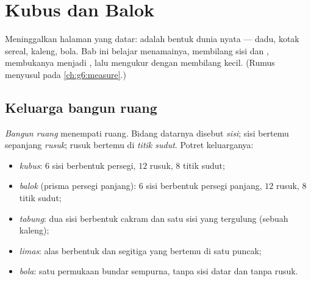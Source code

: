\chapter{Kubus dan Balok}\label{ch:g5:solids}

Meninggalkan halaman yang datar:  adalah bentuk dunia
nyata --- dadu, kotak sereal, kaleng, bola. Bab ini belajar
menamainya, membilang sisi dan , membukanya menjadi
, lalu mengukur  dengan membilang  kecil.
(Rumus  menyusul pada \cref{ch:g6:measure}.)

\section{Keluarga bangun ruang}

\begin{definition}\label{def:g5:solids:def}
\emph{Bangun ruang} menempati ruang. Bidang
datarnya disebut \emph{sisi}; sisi bertemu sepanjang
\emph{rusuk}; rusuk bertemu di \emph{titik
sudut}. Potret keluarganya:
\begin{itemize}
  \item \emph{kubus}: $6$ sisi berbentuk persegi, $12$
        rusuk, $8$ titik sudut;
  \item \emph{balok} (prisma persegi panjang): $6$ sisi
        berbentuk persegi panjang, $12$ rusuk, $8$ titik sudut;
  \item \emph{tabung}: dua sisi berbentuk cakram dan satu sisi
        yang tergulung (sebuah kaleng);
  \item \emph{limas}: alas berbentuk  dan segitiga yang
        bertemu di satu puncak;
  \item \emph{bola}: satu permukaan bundar sempurna, tanpa sisi
        datar dan tanpa rusuk.
\end{itemize}
\end{definition}

